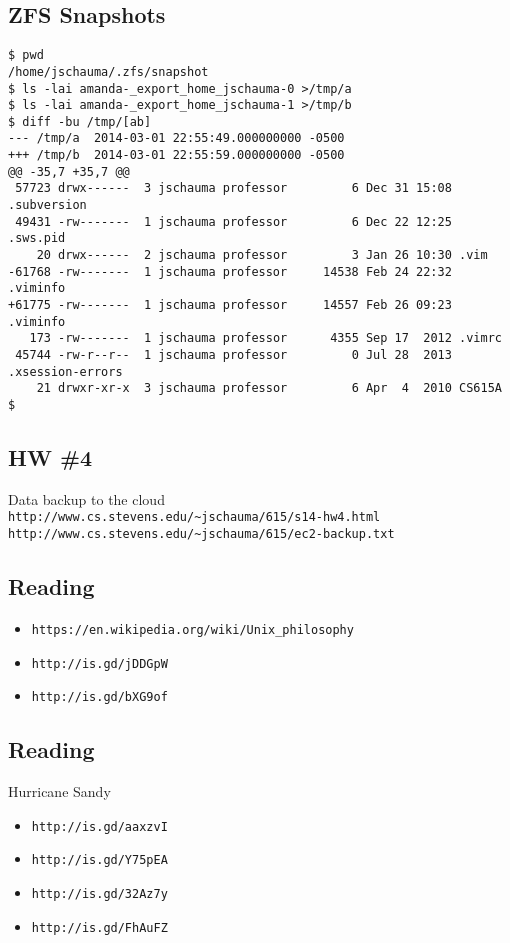 \documentclass[xga]{xdvislides}
\begin{document}
\subsection{ZFS Snapshots}
\smallish
\begin{verbatim}
$ pwd
/home/jschauma/.zfs/snapshot
$ ls -lai amanda-_export_home_jschauma-0 >/tmp/a
$ ls -lai amanda-_export_home_jschauma-1 >/tmp/b
$ diff -bu /tmp/[ab]
--- /tmp/a	2014-03-01 22:55:49.000000000 -0500
+++ /tmp/b	2014-03-01 22:55:59.000000000 -0500
@@ -35,7 +35,7 @@
 57723 drwx------  3 jschauma professor         6 Dec 31 15:08 .subversion
 49431 -rw-------  1 jschauma professor         6 Dec 22 12:25 .sws.pid
    20 drwx------  2 jschauma professor         3 Jan 26 10:30 .vim
-61768 -rw-------  1 jschauma professor     14538 Feb 24 22:32 .viminfo
+61775 -rw-------  1 jschauma professor     14557 Feb 26 09:23 .viminfo
   173 -rw-------  1 jschauma professor      4355 Sep 17  2012 .vimrc
 45744 -rw-r--r--  1 jschauma professor         0 Jul 28  2013 .xsession-errors
    21 drwxr-xr-x  3 jschauma professor         6 Apr  4  2010 CS615A
$
\end{verbatim}
\Normalsize

\subsection{HW \#4}
Data backup to the cloud \\
\verb+http://www.cs.stevens.edu/~jschauma/615/s14-hw4.html+
\\
\verb+http://www.cs.stevens.edu/~jschauma/615/ec2-backup.txt+

\subsection{Reading}
\begin{itemize}
	\item \verb+https://en.wikipedia.org/wiki/Unix_philosophy+
	\item \verb+http://is.gd/jDDGpW+
	\item \verb+http://is.gd/bXG9of+
\end{itemize}

\subsection{Reading}
Hurricane Sandy
\begin{itemize}
	\item \verb+http://is.gd/aaxzvI+
	\item \verb+http://is.gd/Y75pEA+
	\item \verb+http://is.gd/32Az7y+
	\item \verb+http://is.gd/FhAuFZ+
\end{itemize}
\end{document}
